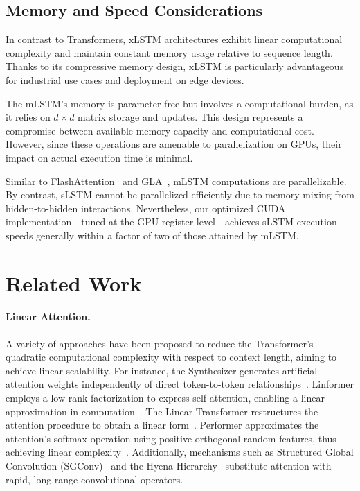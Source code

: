 \subsection{Memory and Speed Considerations}

In contrast to Transformers, xLSTM architectures exhibit linear computational complexity and maintain constant memory usage relative to sequence length. Thanks to its compressive memory design, xLSTM is particularly advantageous for industrial use cases and deployment on edge devices.

The mLSTM's memory is parameter-free but involves a computational burden, as it relies on $d \times d$ matrix storage and updates. This design represents a compromise between available memory capacity and computational cost. However, since these operations are amenable to parallelization on GPUs, their impact on actual execution time is minimal.

Similar to FlashAttention~\citep{Dao:22,Dao:23} and GLA~\citep{Yang:23arxiv}, mLSTM computations are parallelizable. By contrast, sLSTM cannot be parallelized efficiently due to memory mixing from hidden-to-hidden interactions. Nevertheless, our optimized CUDA implementation—tuned at the GPU register level—achieves sLSTM execution speeds generally within a factor of two of those attained by mLSTM.

\section{Related Work}
\label{sec:related}

\paragraph{Linear Attention.} A variety of approaches have been proposed to reduce the Transformer's quadratic computational complexity with respect to context length, aiming to achieve linear scalability. For instance, the Synthesizer generates artificial attention weights independently of direct token-to-token relationships~\citep{Tay:20arxiv}. Linformer employs a low-rank factorization to express self-attention, enabling a linear approximation in computation~\citep{Wang:20arxiv}. The Linear Transformer restructures the attention procedure to obtain a linear form~\citep{Katharopoulos:20}. Performer approximates the attention's softmax operation using positive orthogonal random features, thus achieving linear complexity~\citep{Choromanski:21}. Additionally, mechanisms such as Structured Global Convolution (SGConv)~\citep{Li:22} and the Hyena Hierarchy~\citep{Poli:23} substitute attention with rapid, long-range convolutional operators.

